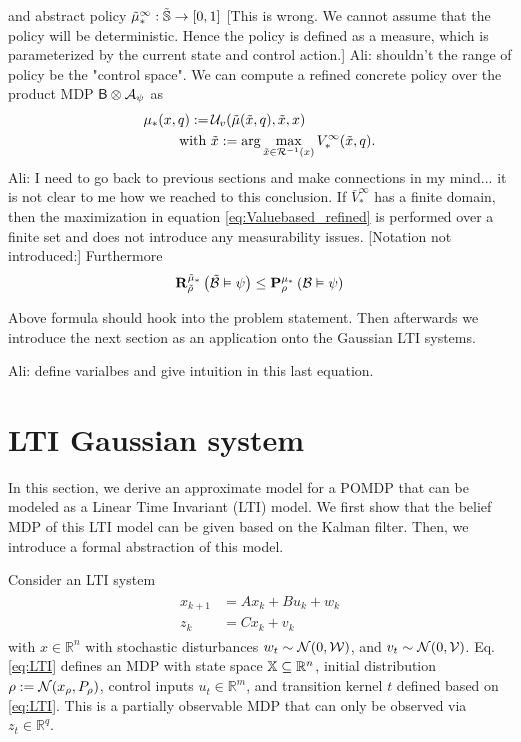 \documentclass{ifacconf}
\newcommand{\red}[1]{{\color{red} #1}}
\renewcommand{\axx}[1]{{\color{orange} Ali: #1}}
\begin{document}
	and abstract policy 	\red{$\tilde  {{\mu}}^\infty_\ast:\tilde{{\mathbb{S}}} \rightarrow [0,1]$ [This is wrong.  We cannot assume that the policy will be deterministic. Hence the policy is defined as a measure, which is parameterized by the current state and control action.] }\axx{shouldn't the range of policy be the "control space"}. We can compute a refined  concrete policy over the product MDP $\mathsf{B}\otimes\mathcal{A}_\psi$ as
	\begin{align}\label{eq:Valuebased_refined}
		{\mu}_\ast(x,q):=\, &\mathcal{U}_{v}( \tilde{{\mu}}(\tilde x, q), \tilde x, x) \\ \mbox{ with } &\tilde x:=\arg\max_{ \tilde x\in
		\mathcal{R}^{-1}(x)} \relax V^\infty_\ast(\tilde x,q).
	\end{align}
\axx{I need to go back to previous sections and make connections in my mind... it is not clear to me how we reached to this conclusion.}
If  $\bar V^\infty_\ast$ has a finite domain, then  the maximization in equation \eqref{eq:Valuebased_refined} is performed over a finite set and does not introduce any measurability issues. 	\red{[Notation not introduced:]}
	Furthermore
\begin{align}
  \mathbf R^{\tilde {{\mu}}_\ast}_{\tilde\rho}\left(
\tilde{\mathcal{B}}
 \vDash \psi \right)\leq   \mathbf P^{ {\mu}_\ast} _{ \rho}\left(
 {\mathcal{B}}
 \vDash \psi \right)
\end{align}
 
\red{Above formula should hook into the problem statement. Then afterwards we introduce the next section as an application onto the Gaussian LTI systems.}
 
\axx{define varialbes and give intuition in this last equation.}
 

\section{LTI Gaussian system}\label{sec:case}
In this section, we derive an approximate model for a POMDP that can be modeled as a Linear Time Invariant (LTI) model.  We first show that the belief MDP of this LTI model can be given based on the Kalman filter. Then, we introduce a formal abstraction of this model.

Consider an LTI system
 \begin{align} \label{eq:LTI} \begin{aligned}
x_{k+1}&=A x_{k} + B u_k+ w_k\\
z_k&=Cx_k+v_k\end{aligned} \end{align}
with $x\in \mathbb{R}^n$ with stochastic disturbances $w_t\sim \mathcal N(0,\mathcal{W})$, and $v_t\sim \mathcal N(0,\mathcal{V})$. 
Eq. \eqref{eq:LTI}  defines an MDP with state space ${\mathbb{X}}\subseteq\mathbb R^n$,  initial distribution  $\rho:=\mathcal N(x_\rho,P_\rho)$,  control inputs $u_t\in\mathbb R^m$, and transition kernel $t$ defined based on  \eqref{eq:LTI}. This is a partially observable MDP that can only be observed via  $z_t\in\mathbb R^q$.
 
\end{document}

